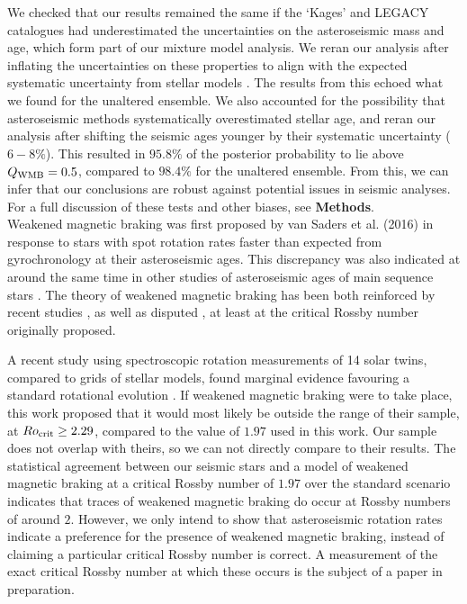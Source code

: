 \documentclass[12pt]{article}
\newcommand{\rtwo}[1]{{#1}}
\begin{document}
We checked that our results remained the same if the `Kages' and LEGACY catalogues had underestimated the uncertainties on the asteroseismic mass and age, which form part of our mixture model analysis. We reran our analysis after inflating the uncertainties on these properties to align with the expected systematic uncertainty from stellar models \cite{silvaaguirre+2015,silvaaguirre+2017}. The results from this echoed what we found for the unaltered ensemble. We also accounted for the possibility that asteroseismic methods systematically overestimated stellar age, and reran our analysis after shifting the seismic ages younger by their systematic uncertainty ($6-8\%$). This resulted in $95.8\%$ of the posterior probability to lie above $Q_{\rm WMB} = 0.5$, compared to $98.4\%$ for the unaltered ensemble. From this, we can infer that our conclusions are robust against potential issues in seismic analyses. For a full discussion of these tests and other biases, see \textbf{Methods}.\\

Weakened magnetic braking was first proposed by van Saders et al. (2016) \cite[hereafter the `van Saders' study]{vansaders+2016} in response to stars with spot rotation rates faster than expected from gyrochronology at their asteroseismic ages. This discrepancy was also indicated at around the same time in other studies of asteroseismic ages of main sequence stars \cite{angus+2015, nielsen+2015,  davies+2015}. The theory of weakened magnetic braking has been both reinforced by recent studies \cite{metcalfe+egeland2019}, as well as disputed \cite{lorenzo-oliveira+2019}, at least at the critical Rossby number originally proposed.

A recent study using spectroscopic rotation measurements of 14 solar twins, compared to grids of stellar models, found marginal evidence favouring a standard rotational evolution \cite{lorenzo-oliveira+2019}. If weakened magnetic braking were to take place, this work proposed that it would most likely be outside the range of their sample, at $Ro_{\rm {crit}} \geq 2.29$, compared to the value of $1.97$ used in this work. Our sample does not overlap with theirs, so we can not directly compare to their results.
The statistical agreement between our seismic stars and a model of weakened magnetic braking at a critical Rossby number of $1.97$ over the standard scenario indicates that traces of weakened magnetic braking do occur at Rossby numbers of around $2$. \rtwo{However, we only intend to show that asteroseismic rotation rates indicate a preference for the presence of weakened magnetic braking, instead of claiming a particular critical Rossby number is correct. A measurement of the exact critical Rossby number at which these occurs is the subject of a paper in preparation.}
\end{document}
